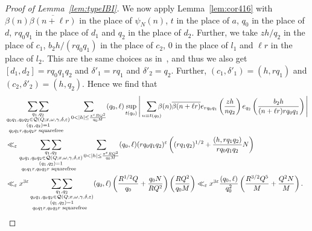 \documentclass{amsart}
\numberwithin{equation}{section}
\begin{document}
\begin{proof}[Proof of Lemma~\ref{lem:typeIBI}]
We now apply Lemma~\ref{lem:cor416} with $\beta(n)\overline{\beta(n+\ell r)}$ in the place of $\psi_N(n)$, $t$ in the place of $a$, $q_0$ in the place of $d$, $r q_0q_1$ in the place of $d_1$ and $q_2$ in the place of $d_2$. Further, we take $zh/q_2$ in the place of $c_1$, $b_2h/(rq_0q_1)$ in the place of $c_2$, $0$ in the place of $l_1$ and $\ell r$ in the place of $l_2$. This are the same choices as in~\cite{Baker:2017:BIP}, and thus we also get $[d_1,d_2]= rq_0q_1q_2$ and $\delta'_1 = rq_1$ and $\delta'_2=q_2$. Further, $(c_1, \delta'_1)= (h,rq_1)$ and $(c_2, \delta'_2)=(h,q_2)$.  Hence we find that
\begin{align*}
 &\mathop{\sum\sum}\limits_{\substack{q_1, q_2 \\ q_0 q_1,q_0 q_2 \in \mathcal{Q}(Q;x,\omega,\gamma,\delta,\varepsilon) \\ (q_1,q_2)=1 \\  q_0q_1r, q_0q_2r \mbox{\begin{scriptsize}
squarefree
\end{scriptsize} }
}} \sum_{0<|h| \leq \frac{x^\varepsilon RQ^2}{q_0 M}}  (q_0,\ell) \sup_{ t(q_0)}   \Bigg| \sum_{\substack{n  \equiv t (q_0) }} \!\!\!\! \beta(n)\overline{\beta(n+\ell r)}   e_{rq_0q_1}\left(\dfrac{z h}{nq_2}\right) e_{q_2}\left(\dfrac{b_2h}{(n+\ell r)rq_0q_1}\right) \Bigg|  \\ 
&\ll_\varepsilon 
\mathop{\sum\sum}\limits_{\substack{q_1, q_2 \\  q_0 q_1,q_0 q_2 \in \mathcal{Q}(Q;x,\omega,\gamma,\delta,\varepsilon) \\ (q_1,q_2)=1 \\  q_0q_1r, q_0q_2r \mbox{\begin{scriptsize}
squarefree
\end{scriptsize} }
}} \sum_{0<|h| \leq \frac{x^\varepsilon RQ^2}{q_0 M}}  (q_0,\ell) (rq_0q_1q_2)^\varepsilon \left( ( rq_1q_2)^{1/2} +   \frac{(h,rq_1q_2)}{rq_0q_1q_2} N\right) \\
&\ll_\varepsilon  x^{3\varepsilon}
\mathop{\sum\sum}\limits_{\substack{q_1, q_2 \\ q_0 q_1,q_0 q_2 \in \mathcal{Q}(Q;x,\omega,\gamma,\delta,\varepsilon) \\ (q_1,q_2)=1 \\  q_0q_1r, q_0q_2r \mbox{\begin{scriptsize}
squarefree
\end{scriptsize} }
}}  (q_0,\ell)  \left( \frac{R^{1/2}Q}{q_0}+   \frac{q_0 N}{RQ^2}  \right)  \left( \frac{  RQ^2}{q_0 M}\right)  \ll_\varepsilon 
x^{3\varepsilon} \frac{(q_0,\ell)}{q_0^2}  \left( \frac{R^{3/2}Q^5}{ M}+   \frac{ Q^2 N}{M}  \right).  

\end{align*}
\end{proof}
\end{document}
